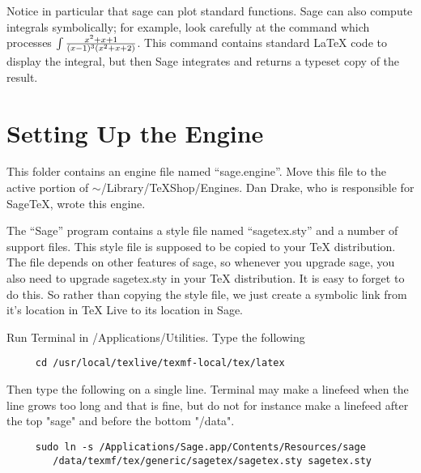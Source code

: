 \documentclass[11pt, oneside]{amsart}
\begin{document}
Notice in particular that sage can plot standard functions. Sage can also compute integrals symbolically; for example, look carefully at the command which processes $\int {{x^2 + x + 1} \over {(x - 1)^3 (x^2 + x + 2)}}$. This command contains standard LaTeX code to display the integral, but then Sage integrates and returns a typeset copy of the result.


\section{Setting Up the Engine}

This folder contains an engine file named ``sage.engine''. Move this file to the active portion of $\sim$/Library/TeXShop/Engines.
Dan Drake, who is responsible for SageTeX, wrote this engine.

The ``Sage'' program contains a style file named ``sagetex.sty'' and a number of support files. This style file is supposed to be copied to your TeX distribution. The file depends on other features of sage, so whenever you upgrade sage, you also need to upgrade sagetex.sty in your TeX distribution. It is easy to forget to do this. So rather than copying the style file, we just
create a symbolic link from it's location in TeX Live to its location in Sage.

Run Terminal in /Applications/Utilities. Type the following
\begin{verbatim}
     cd /usr/local/texlive/texmf-local/tex/latex
\end{verbatim}
Then type the following on a single line. Terminal may make a linefeed when
the line  grows too long and that is fine, but do not for instance make a linefeed
after the top "sage" and before the bottom "/data".
\begin{verbatim}
     sudo ln -s /Applications/Sage.app/Contents/Resources/sage
        /data/texmf/tex/generic/sagetex/sagetex.sty sagetex.sty
\end{verbatim}
\end{document}
